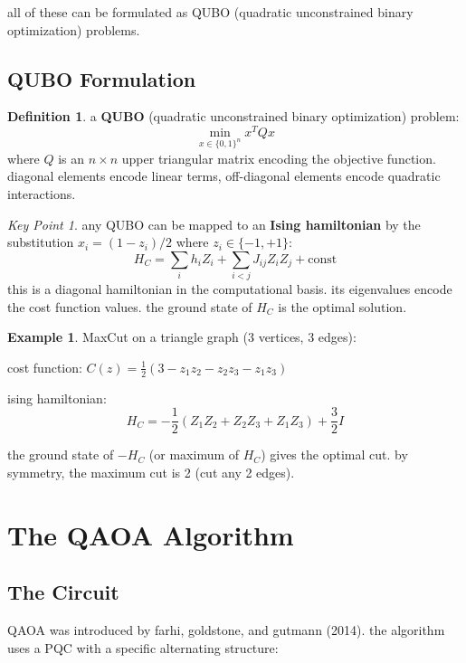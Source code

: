 \documentclass[11pt,a4paper]{article}
\theoremstyle{definition}
\newtheorem{definition}{Definition}[section]
\newtheorem{example}{Example}[section]
\theoremstyle{remark}
\newtheorem*{keypoint}{Key Point}
\begin{document}
all of these can be formulated as QUBO (quadratic unconstrained binary optimization) problems.

\subsection{QUBO Formulation}

\begin{definition}
a \textbf{QUBO} (quadratic unconstrained binary optimization) problem:
\[
\min_{x \in \{0,1\}^n} x^T Q x
\]
where $Q$ is an $n \times n$ upper triangular matrix encoding the objective function. diagonal elements encode linear terms, off-diagonal elements encode quadratic interactions.
\end{definition}

\begin{keypoint}
any QUBO can be mapped to an \textbf{Ising hamiltonian} by the substitution $x_i = (1 - z_i)/2$ where $z_i \in \{-1, +1\}$:
\[
H_C = \sum_{i} h_i Z_i + \sum_{i < j} J_{ij} Z_i Z_j + \text{const}
\]
this is a diagonal hamiltonian in the computational basis. its eigenvalues encode the cost function values. the ground state of $H_C$ is the optimal solution.
\end{keypoint}

\begin{example}
MaxCut on a triangle graph (3 vertices, 3 edges):

cost function: $C(z) = \frac{1}{2}(3 - z_1 z_2 - z_2 z_3 - z_1 z_3)$

ising hamiltonian:
\[
H_C = -\frac{1}{2}(Z_1 Z_2 + Z_2 Z_3 + Z_1 Z_3) + \frac{3}{2}I
\]

the ground state of $-H_C$ (or maximum of $H_C$) gives the optimal cut. by symmetry, the maximum cut is 2 (cut any 2 edges).
\end{example}

\section{The QAOA Algorithm}

\subsection{The Circuit}

QAOA was introduced by farhi, goldstone, and gutmann (2014). the algorithm uses a PQC with a specific alternating structure:
\end{document}
